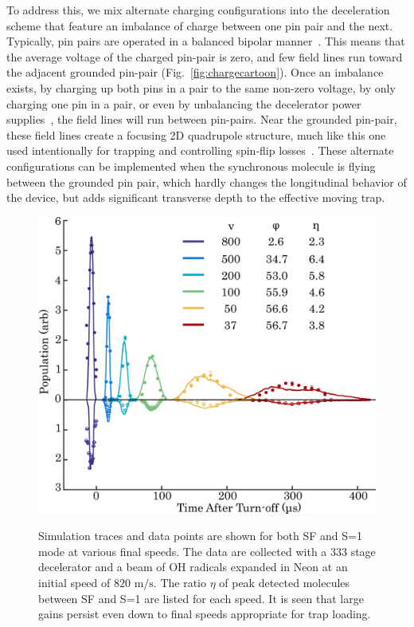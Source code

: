 \documentclass[%
 reprint,
 amsmath,amssymb,
 aps,
pra,
]{revtex4-1}
\begin{document}
To address this, we mix alternate charging configurations into the deceleration scheme that feature an imbalance of charge between one pin pair and the next. Typically, pin pairs are operated in a balanced bipolar manner~\cite{VanDeMeerakker2012}. This means that the average voltage of the charged pin-pair is zero, and few field lines run toward the adjacent grounded pin-pair (Fig.~\ref{fig:chargecartoon}). Once an imbalance exists, by charging up both pins in a pair to the same non-zero voltage, by only charging one pin in a pair, or even by unbalancing the decelerator power supplies~\cite{Hoekstra2018}, the field lines will run between pin-pairs. Near the grounded pin-pair, these field lines create a focusing 2D quadrupole structure, much like this one used intentionally for trapping and controlling spin-flip losses~\cite{Reens2017}. These alternate configurations can be implemented when the synchronous molecule is flying between the grounded pin pair, which hardly changes the longitudinal behavior of the device, but adds significant transverse depth to the effective moving trap.

\begin{figure}[t]
\includegraphics[width=\linewidth]{speedvary.png}%
\label{fig:speedvary}
\caption{
Simulation traces and data points are shown for both SF and S=1 mode at various final speeds. The data are collected with a $333$ stage decelerator and a beam of OH radicals expanded in Neon at an initial speed of $820\text{ m/s}$. The ratio $\eta$ of peak detected molecules between SF and S=1 are listed for each speed. It is seen that large gains persist even down to final speeds appropriate for trap loading.
}
\end{figure}
\end{document}
